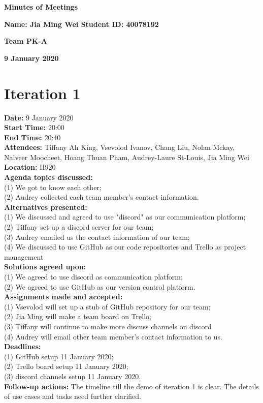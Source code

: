 \documentclass[12pt]{article}
\begin{document}
\vspace*{0.2in}
\centerline{\bf\Large Minutes of Meetings}

\vspace*{0.2in}
\centerline{\bf\Large Name: Jia Ming Wei   Student ID: 40078192}

\vspace*{0.2in}
\centerline{\bf\Large Team PK-A}

\vspace*{0.2in}
\centerline{\bf\Large 9 January 2020}

\newpage

\section{Iteration 1}

{\bf Date:} 9 January 2020\\
{\bf Start Time:} 20:00\\
{\bf End Time:}  20:40\\
{\bf Attendees:} Tiffany Ah King,
Vsevolod Ivanov,
Chang Liu,
Nolan Mckay,
Nalveer Moocheet,
Hoang Thuan Pham,
Audrey-Laure St-Louis,
Jia Ming Wei\\
{\bf Location:} H920 \\
{\bf Agenda topics discussed:} \\(1) We got to know each other; \\(2) Audrey collected each team member's contact information. \\
{\bf Alternatives presented:} \\(1) We discussed and agreed to use "discord" as our communication platform; \\(2) Tiffany set up a discord server for our team; \\(3) Audrey emailed us the contact information of our team; \\(4) We discussed to use GitHub as our code repositories and Trello as project management\\
{\bf Solutions agreed upon:} \\(1) We agreed to use discord as communication platform; \\(2) We agreed to use GitHub as our version control platform. \\
{\bf Assignments made and accepted:} \\(1) Vsevolod will set up a stub of GitHub repository for our team; \\(2) Jia Ming will make a team board on Trello; \\(3) Tiffany will continue to make more discuss channels on discord \\(4) Audrey will email other team member's contact information to us.\\
{\bf Deadlines:} \\(1) GitHub setup 11 January 2020; \\(2) Trello board setup 11 January 2020; \\(3) discord channels setup 11 January 2020. \\
{\bf Follow-up actions:} The timeline till the demo of iteration 1 is clear. The details of use cases and tasks need further clarified.\\
\end{document}
